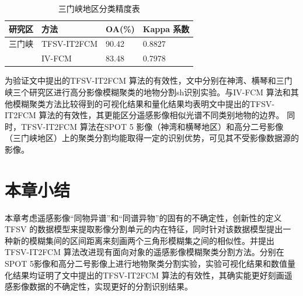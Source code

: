 \begin{table}[htbp]
    \caption{三门峡地区分类精度表}\label{tab:sanmenxia_oa}
    \centering
    \footnotesize
    \begin{tabular}{llll}
        \toprule
        研究区 & 方法        & OA(\%) & Kappa 系数 \\
        \midrule
        三门峡 & TFSV-IT2FCM & 90.42  & 0.8827     \\
               & IV-FCM      & 83.48  & 0.7978     \\
        \bottomrule
    \end{tabular}
\end{table}

为验证文中提出的TFSV-IT2FCM 算法的有效性，文中分别在神湾、横琴和三门峡三个研究区进行高分影像模糊聚类的地物分割sh识别实验。与IV-FCM 算法和其他模糊聚类方法比较得到的可视化结果和量化结果均表明文中提出的TFSV-IT2FCM 算法的有效性，其更能区分遥感影像相似光谱不同类别地物的边界。 同时，TFSV-IT2FCM 算法在SPOT 5 影像（神湾和横琴地区）和高分二号影像（三门峡地区）上的聚类分割均能取得一定的识别优势，可见其不受影像数据源的影像。

\section{本章小结}
\label{sec::chap03-5}
本章考虑遥感影像“同物异谱”和“同谱异物”的固有的不确定性，创新性的定义TFSV 的数据模型来提取影像分割单元的内在特征，同时针对该数据模型提出一种新的模糊集间的区间距离来刻画两个三角形模糊集之间的相似性。并提出TFSV-IT2FCM 算法改进现有面向对象的遥感影像模糊聚类分割方法。分别在SPOT 5影像和高分二号影像上进行地物聚类分割实验，实验可视化结果和数值量化结果均证明了文中提出的TFSV-IT2FCM 算法的有效性，其确实能更好刻画遥感影像数据的不确定性，实现更好的分割识别结果。
